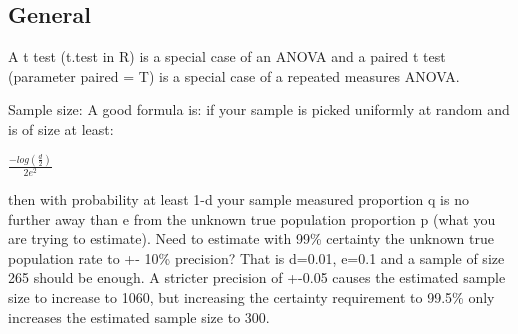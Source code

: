 \documentclass[]{book}
\theoremstyle{definition}
\theoremstyle{definition}
\theoremstyle{definition}
\theoremstyle{remark}
\begin{document}
\subsection{General}\label{general-8}

A t test (t.test in R) is a special case of an ANOVA and a paired t test
(parameter paired = T) is a special case of a repeated measures ANOVA.

Sample size: A good formula is: if your sample is picked uniformly at
random and is of size at least:

\(\frac{-log(\frac{d}{2})}{2e^2}\)

then with probability at least 1-d your sample measured proportion q is
no further away than e from the unknown true population proportion p
(what you are trying to estimate). Need to estimate with 99\% certainty
the unknown true population rate to +- 10\% precision? That is d=0.01,
e=0.1 and a sample of size 265 should be enough. A stricter precision of
+-0.05 causes the estimated sample size to increase to 1060, but
increasing the certainty requirement to 99.5\% only increases the
estimated sample size to 300.
\end{document}

